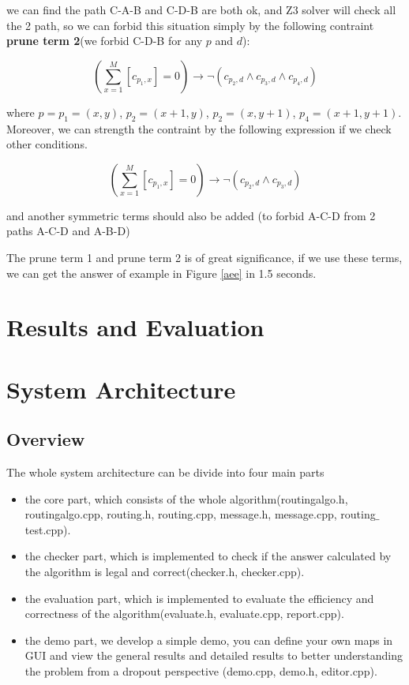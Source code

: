 \documentclass[twocolumn]{article}
\begin{document}
we can find the path C-A-B and C-D-B are both ok, and Z3 solver will check all the 2 path, so we can forbid this situation simply by the following contraint \textbf{prune term 2}(we forbid C-D-B for any $p$ and $d$):

\[
(\sum_{x=1}^{M}{[c_{p_1,x}]} = 0) \to \neg(c_{p_2,d} \wedge c_{p_3,d} \wedge c_{p_4,d})
\]

where $p = p_1 = (x, y)$, $p_2 = (x + 1, y)$, $p_2 = (x, y + 1)$, $p_4 = (x + 1, y + 1)$. Moreover, we can strength the contraint by the following expression if we check other conditions.

\[
(\sum_{x=1}^{M}{[c_{p_1,x}]} = 0) \to \neg(c_{p_2,d} \wedge c_{p_3,d})
\]

and another symmetric terms should also be added (to forbid A-C-D from 2 paths A-C-D and A-B-D)

The prune term 1 and prune term 2 is of great significance, if we use these terms, we can get the answer of example in Figure \ref{aee} in 1.5 seconds.

\section{Results and Evaluation}


\section{System Architecture}

\subsection{Overview}

The whole system architecture can be divide into four main parts

\begin{itemize}
    \item the core part, which consists of the whole algorithm(routingalgo.h, routingalgo.cpp, routing.h, routing.cpp, message.h, message.cpp, routing$\_$test.cpp).
    \item the checker part, which is implemented to check if the answer calculated by the algorithm is legal and correct(checker.h, checker.cpp).
    \item the evaluation part, which is implemented to evaluate the efficiency and correctness of the algorithm(evaluate.h, evaluate.cpp, report.cpp).
    \item the demo part, we develop a simple demo, you can define your own maps in GUI and view the general results and detailed results to better understanding the problem from a dropout perspective (demo.cpp, demo.h, editor.cpp).
\end{itemize}
\end{document}
